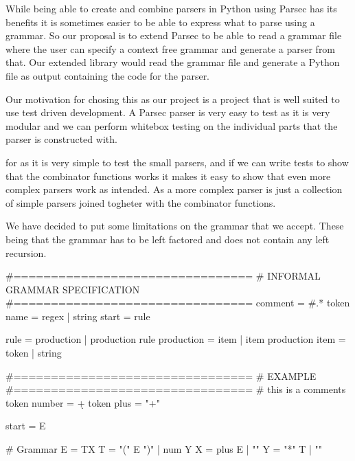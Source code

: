 While being able to create and combine parsers in Python using Parsec has its benefits it is sometimes easier to be able to express what to parse using a grammar. So our proposal is to extend Parsec to be able to read a grammar file where the user can specify a context free grammar and generate a parser from that. Our extended library would read the grammar file and generate a Python file as output containing the code for the parser. 


Our motivation for chosing this as our project is a project that is well suited to use test driven development. A Parsec parser is very easy to test as it is very modular and we can perform whitebox testing on the individual parts that the parser is constructed with.


for as it is very simple to test the small parsers, and if we can write tests to show that the combinator functions works it makes it easy to show that even more complex parsers work as intended. As a more complex parser is just a collection of simple parsers joined togheter with the combinator functions. 

We have decided to put some limitations on the grammar that we accept. These being that the grammar has to be left factored and does not contain any left recursion.
\begin{python}
#================================
# INFORMAL GRAMMAR SPECIFICATION
#================================
comment = #.*\n
token name = regex | string
start = rule

rule = production | production rule
production = item | item production
item = token | string

#================================
# EXAMPLE
#================================
# this is a comments
token number = \d+
token plus = "+"

start = E

# Grammar
E = TX
T = "(" E ")" | num Y
X = plus E | ""
Y = "*" T  | ""
\end{python}
